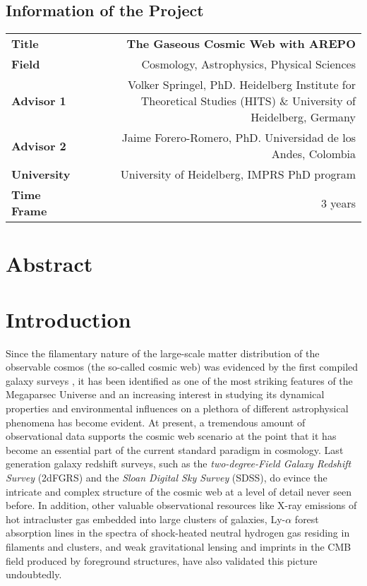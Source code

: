 \documentclass[a4,useAMS,usenatbib,usegraphicx,12pt]{article}
\begin{document}
\subsection*{Information of the Project}
\begin{tabular}{L!{\VRule}R}
\bf Title		& \bf The Gaseous Cosmic Web with AREPO\\
\bf Field		& Cosmology, Astrophysics, Physical Sciences \\
\bf Advisor 1	& Volker Springel, PhD. Heidelberg Institute for Theoretical Studies (HITS) \& University of Heidelberg, Germany \\
\bf Advisor 2	& Jaime Forero-Romero, PhD. Universidad de los Andes, Colombia \\
\bf University	& University of Heidelberg, IMPRS PhD program \\
\bf Time Frame	& 3 years \\
\end{tabular}
\normalsize


\section{Abstract}


\section{Introduction}


Since the filamentary nature of the large-scale matter distribution of the 
observable cosmos (the so-called cosmic web) was evidenced by the first compiled 
galaxy surveys \citep{Chincarini75, Gregory78, Einasto80M, Einasto80N, 
Kirshner81, Kirshner87}, it has been identified as one of the most striking 
features of the Megaparsec Universe and an increasing interest in studying its 
dynamical properties and environmental influences on a plethora of different 
astrophysical phenomena has become evident. At present, a tremendous amount of 
observational data supports the cosmic web scenario at the point that it has 
become an essential part of the current standard paradigm in cosmology. Last 
generation galaxy redshift surveys, such as the \textit{two-degree-Field Galaxy 
Redshift Survey} (2dFGRS) and the \textit{Sloan Digital Sky Survey} (SDSS), do
evince the intricate and complex structure of the cosmic web at a level of 
detail never seen before. In addition, other valuable observational resources 
like X-ray emissions of hot intracluster gas embedded into large clusters of 
galaxies, Ly-$\alpha$ forest absorption lines in the spectra of shock-heated 
neutral hydrogen gas residing in filaments and clusters, and weak gravitational 
lensing and imprints in the CMB field produced by foreground structures, have 
also validated this picture undoubtedly.
\end{document}
